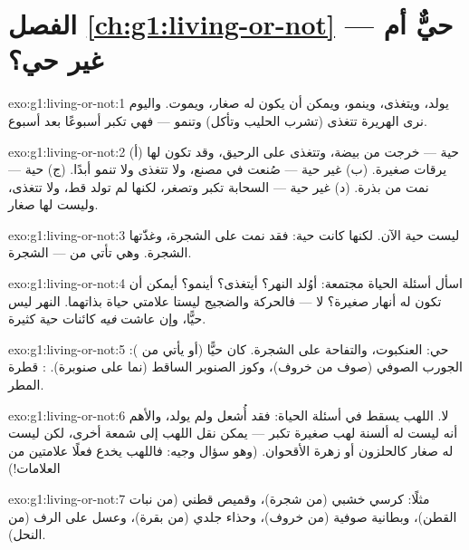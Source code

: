 \section*{الفصل \ref{ch:g1:living-or-not} --- حيٌّ أم غير حي؟}

\begin{solution}{exo:g1:living-or-not:1}
يولد، ويتغذى، وينمو، ويمكن أن يكون له صغار، ويموت. واليوم نرى
الهريرة تتغذى (تشرب الحليب وتأكل) وتنمو --- فهي تكبر أسبوعًا بعد
أسبوع.
\end{solution}

\begin{solution}{exo:g1:living-or-not:2}
(أ) حية --- خرجت من بيضة، وتتغذى على الرحيق، وقد تكون لها يرقات
صغيرة. (ب) غير حية --- صُنعت في مصنع، ولا تتغذى ولا تنمو أبدًا.
(ج) حية --- نمت من بذرة. (د) غير حية --- السحابة تكبر وتصغر،
لكنها لم تولد قط، ولا تتغذى، وليست لها صغار.
\end{solution}

\begin{solution}{exo:g1:living-or-not:3}
ليست حية الآن. لكنها كانت حية: فقد نمت على الشجرة، وغذّتها
الشجرة. وهي تأتي من  --- الشجرة.
\end{solution}

\begin{solution}{exo:g1:living-or-not:4}
اسأل أسئلة الحياة مجتمعة: أوُلد النهر؟ أيتغذى؟ أينمو؟ أيمكن أن
تكون له أنهار صغيرة؟ لا --- فالحركة والضجيج ليستا علامتي حياة
بذاتهما. النهر ليس حيًّا، وإن عاشت \emph{فيه} كائنات حية كثيرة.
\end{solution}

\begin{solution}{exo:g1:living-or-not:5}
حي: العنكبوت، والتفاحة على الشجرة. كان حيًّا (أو يأتي من ): الجورب الصوفي (صوف من خروف)، وكوز الصنوبر الساقط (نما على
صنوبرة). : قطرة المطر.
\end{solution}

\begin{solution}{exo:g1:living-or-not:6}
لا. اللهب يسقط في أسئلة الحياة: فقد أُشعل ولم يولد، والأهم أنه
ليست له ألسنة لهب صغيرة تكبر --- يمكن نقل اللهب إلى شمعة أخرى،
لكن ليست له صغار كالحلزون أو زهرة الأقحوان. (وهو سؤال وجيه: فاللهب
يخدع فعلًا علامتين من العلامات!)
\end{solution}

\begin{solution}{exo:g1:living-or-not:7}
مثلًا: كرسي خشبي (من شجرة)، وقميص قطني (من نبات القطن)، وبطانية
صوفية (من خروف)، وحذاء جلدي (من بقرة)، وعسل على الرف (من النحل).
\end{solution}

